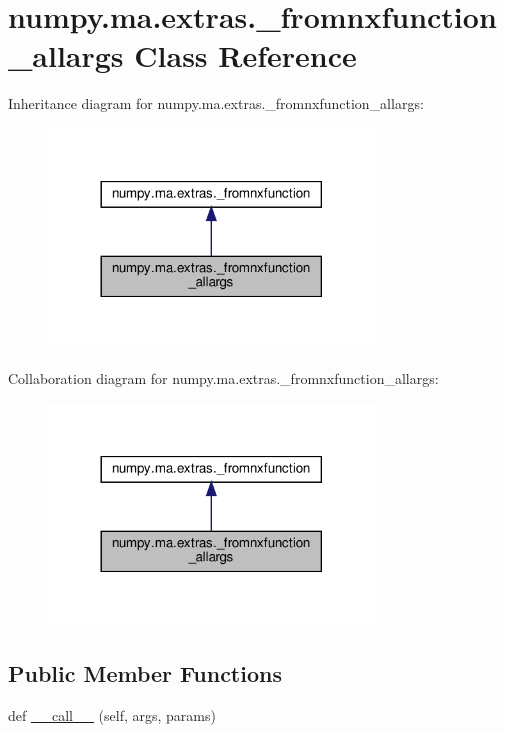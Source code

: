 \hypertarget{classnumpy_1_1ma_1_1extras_1_1__fromnxfunction__allargs}{}\section{numpy.\+ma.\+extras.\+\_\+fromnxfunction\+\_\+allargs Class Reference}
\label{classnumpy_1_1ma_1_1extras_1_1__fromnxfunction__allargs}


Inheritance diagram for numpy.\+ma.\+extras.\+\_\+fromnxfunction\+\_\+allargs\+:
\nopagebreak
\begin{figure}[H]
\begin{center}
\leavevmode
\includegraphics[width=245pt]{classnumpy_1_1ma_1_1extras_1_1__fromnxfunction__allargs__inherit__graph}
\end{center}
\end{figure}


Collaboration diagram for numpy.\+ma.\+extras.\+\_\+fromnxfunction\+\_\+allargs\+:
\nopagebreak
\begin{figure}[H]
\begin{center}
\leavevmode
\includegraphics[width=245pt]{classnumpy_1_1ma_1_1extras_1_1__fromnxfunction__allargs__coll__graph}
\end{center}
\end{figure}
\subsection*{Public Member Functions}
\begin{DoxyCompactItemize}
\item 
def \hyperlink{classnumpy_1_1ma_1_1extras_1_1__fromnxfunction__allargs_abc3d29961f36a752ff2115f4108bdbfb}{\+\_\+\+\_\+call\+\_\+\+\_\+} (self, args, params)
\end{DoxyCompactItemize}


